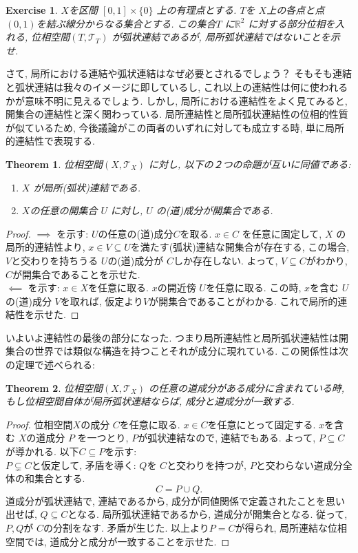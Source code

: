\documentclass[dvipdfmx]{jbook}
\newtheorem{theorem}{Theorem}[section]
\theoremstyle{remark}
\theoremstyle{plain}
\newtheorem{exercise}{Exercise}[section]
\begin{document}
\begin{exercise}
	$X$を区間 $[0,1] \times \{0\} $ 上の有理点とする. 
	$T$を $X$上の各点と点$(0,1)$を結ぶ線分からなる集合とする.
	この集合$T$ に$\mathbb{R}^2$ に対する部分位相を入れる, 位相空間$\left( T , \mathcal{T}_{T} \right)$
	が弧状連結であるが, 局所弧状連結ではないことを示せ. 
\end{exercise}

さて, 局所における連結や弧状連結はなぜ必要とされるでしょう？
そもそも連結と弧状連結は我々のイメージに即しているし,
これ以上の連結性は何に使われるかが意味不明に見えるでしょう.
しかし, 局所における連結性をよく見てみると, 開集合の連結性と深く関わっている. 
局所連結性と局所弧状連結性の位相的性質が似ているため, 今後議論がこの両者のいずれに対しても成立する時,
単に局所的連結性で表現する.

\begin{theorem}
	位相空間$\left( X , \mathcal{T}_{X} \right)$ に対し, 以下の２つの命題が互いに同値である: 
	\begin{enumerate}
		\item $X$ が局所(弧状)連結である.
		\item $X$の任意の開集合 $U$ に対し, $U$ の(道)成分が開集合である.
	\end{enumerate}
\end{theorem}

\begin{proof}
	$\implies$ を示す:
	$U$の任意の(道)成分$C$を取る. $x \in C$ を任意に固定して, 
	$X$ の局所的連結性より, $x \in V \subseteq U$を満たす(弧状)連結な開集合が存在する, 
	この場合, $V$と交わりを持ちうる $U$の(道)成分が $C$しか存在しない. 
	よって,  $V \subseteq C$がわかり, $C$が開集合であることを示せた.\\
	$ \impliedby$ を示す: 
	 $x \in  X$を任意に取る. $x$の開近傍 $U$を任意に取る.
	 この時, $x$を含む $U$の(道)成分 $V$を取れば,
	 仮定より$V$が開集合であることがわかる. これで局所的連結性を示せた.
\end{proof}

いよいよ連結性の最後の部分になった. つまり局所連結性と局所弧状連結性は開集合の世界では類似な構造を持つことそれが成分に現れている. この関係性は次の定理で述べられる: 

\begin{theorem}
	位相空間$\left( X , \mathcal{T}_{X} \right)$ の任意の道成分がある成分に含まれている時, 
	もし位相空間自体が局所弧状連結ならば, 成分と道成分が一致する.
\end{theorem}

\begin{proof}
	位相空間$X$の成分 $C$を任意に取る. 
	$x \in C $を任意にとって固定する. 
	$x$を含む $X$の道成分 $P$ を一つとり, $P$が弧状連結なので, 連結でもある.
	よって,  $P \subseteq C$が導かれる. 以下$C \subseteq P$を示す: \\
	$P \subsetneq C $と仮定して, 矛盾を導く:
	$Q$を $C$と交わりを持つが,  $P$と交わらない道成分全体の和集合とする. 
	 \[
	C=P \cup Q
	.\]
	道成分が弧状連結で, 連結であるから, 成分が同値関係で定義されたことを思い出せば, $Q\subseteq C$となる.
	局所弧状連結であるから, 道成分が開集合となる. 従って,  $P,Q$が $C$の分割をなす. 矛盾が生じた.
	以上より$P=C$が得られ, 局所連結な位相空間では, 道成分と成分が一致することを示せた. 
\end{proof}
\end{document}
